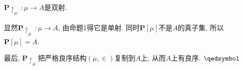 \vspace{7pt}\hspace{-1em}
$\mathbf{P}\!\restriction_\mu\,:\mu\to A$是双射.

显然$\mathbf{P}\!\restriction_\mu\,:\mu\to A$, 由命题1得它是单射.
同时$\mathbf{P}[\mu]$不是$A$的真子集, 所以$\mathbf{P}[\mu]=A$.

\vspace{7pt}
最后, $\mathbf{P}\!\restriction_\mu$把严格良序结构$(\mu,\in)$复制到$A$上,
从而$A$上有良序. \hfill $\qedsymbol$

